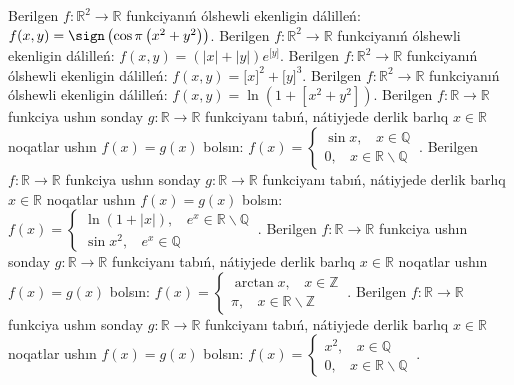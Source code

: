 Berilgen \(f:\mathbb{R}^{2}\mathbb{\rightarrow R}\) funkciyanıń ólshewli ekenligin dálilleń: \(f(x,y) = \sign\left( \cos\pi\left( x^{2} + y^{2} \right) \right)\).
Berilgen \(f:\mathbb{R}^{2}\mathbb{\rightarrow R}\) funkciyanıń ólshewli ekenligin dálilleń: \(f(x,y) = \left( |x| + |y| \right)e^{\lbrack y\rbrack}\).
Berilgen \(f:\mathbb{R}^{2}\mathbb{\rightarrow R}\) funkciyanıń ólshewli ekenligin dálilleń: \(f(x,y) = \lbrack x\rbrack^{2} + \lbrack y\rbrack^{3}\).
Berilgen \(f:\mathbb{R}^{2}\mathbb{\rightarrow R}\) funkciyanıń ólshewli ekenligin dálilleń: \(f(x,y) = \ln\left( 1 + \left\lbrack x^{2} + y^{2} \right\rbrack \right)\).
Berilgen \(f:\mathbb{R \rightarrow R}\) funkciya ushın sonday \(g:\mathbb{R \rightarrow R}\) funkciyanı tabıń, nátiyjede derlik barlıq \(x\mathbb{\in R}\) noqatlar ushın \(f(x) = g(x)\) bolsın: \(f(x) = \left\{ \begin{matrix} \sin x,\ \ \ \ x\mathbb{\in Q} \\ 0,\ \ \ \ x\mathbb{\in R}\backslash\mathbb{Q} \end{matrix} \right.\ \).
Berilgen \(f:\mathbb{R \rightarrow R}\) funkciya ushın sonday \(g:\mathbb{R \rightarrow R}\) funkciyanı tabıń, nátiyjede derlik barlıq \(x\mathbb{\in R}\) noqatlar ushın \(f(x) = g(x)\) bolsın: \(f(x) = \left\{ \begin{matrix} \ln\left( 1 + |x| \right),\ \ \ \ e^{x}\mathbb{\in R}\backslash\mathbb{Q} \\ \sin x^{2},\ \ \ \ e^{x}\mathbb{\in Q} \end{matrix} \right.\ \).
Berilgen \(f:\mathbb{R \rightarrow R}\) funkciya ushın sonday \(g:\mathbb{R \rightarrow R}\) funkciyanı tabıń, nátiyjede derlik barlıq \(x\mathbb{\in R}\) noqatlar ushın \(f(x) = g(x)\) bolsın: \(f(x) = \left\{ \begin{matrix} \arctan x,\ \ \ \ x\mathbb{\in Z} \\ \pi,\ \ \ \ x\mathbb{\in R}\backslash\mathbb{Z} \end{matrix} \right.\ \).
Berilgen \(f:\mathbb{R \rightarrow R}\) funkciya ushın sonday \(g:\mathbb{R \rightarrow R}\) funkciyanı tabıń, nátiyjede derlik barlıq \(x\mathbb{\in R}\) noqatlar ushın \(f(x) = g(x)\) bolsın: \(f(x) = \left\{ \begin{matrix} x^{2},\ \ \ \ x\mathbb{\in Q} \\ 0,\ \ \ \ x\mathbb{\in R}\backslash\mathbb{Q} \end{matrix} \right.\ \).